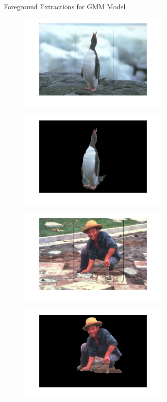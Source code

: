 \documentclass[a4paper]{article}
\begin{document}
\begin{figure}[h]
\caption{Foreground Extractions for GMM Model}
\end{figure}

\begin{figure}[h]
\begin{subfigure}{.5\textwidth}
  \centering
  \includegraphics[width = 3in]{penguin_in.png}
  \label{fig:sfig2}
\end{subfigure}
\begin{subfigure}{.5\textwidth}
  \centering
  \includegraphics[width = 3in]{penguin_out.png}
  \label{fig:sfig2}
\end{subfigure}

\begin{subfigure}{.5\textwidth}
  \centering
  \includegraphics[width = 3in]{man_in.png}
  \label{fig:sfig1}
\end{subfigure}%
\begin{subfigure}{.5\textwidth}
  \centering
  \includegraphics[width = 3in]{man_out.png}
  \label{fig:sfig2}
\end{subfigure}



\end{figure}
\end{document}
